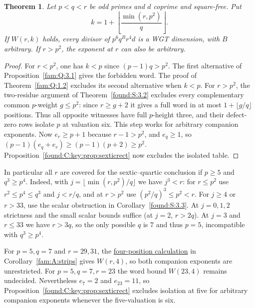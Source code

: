 \documentclass[11pt,a4paper]{article}
\numberwithin{equation}{section}
\newtheorem{theorem}{Theorem}[section]
\theoremstyle{remark}
\begin{document}
\begin{theorem}\label{found:C:2.2}\label{found:C:key:thm:uniformsix}
Let $p<q<r$ be odd primes and $d$ coprime and square-free. Put
\[
 k=1+\left\lfloor\frac{\min(r,p^2)}q\right\rfloor.
\]
If $W(r,k)$ holds, every divisor of $p^6q^B r^4d$ is a WGT
dimension, with $B$ arbitrary. If $r>p^2$, the exponent at $r$
can also be arbitrary.
\end{theorem}
\begin{proof}
For $r<p^2$, one has $k<p$ since $(p-1)q>p^2$.
The first alternative of Proposition~\ref{fam:Q:3.1} gives the forbidden word. The proof of Theorem~\ref{fam:Q:1.2} excludes its second alternative when $k<p$. For $r>p^2$, the two-residue argument of Theorem~\ref{found:S:3.2}
excludes every complementary common $p$-weight $g\le p^2$: since
$r\ge g+2$ it gives a full word in at most $1+\lfloor g/q\rfloor$
positions. Thus all opposite witnesses have full $p$-height three,
and their defect-zero rows isolate $p$ at valuation six. This step
works for arbitrary companion exponents. Now $e_r\ge p+1$ because
$r-1>p^2$, and $e_q\ge1$, so
$(p-1)(e_q+e_r)\ge(p-1)(p+2)\ge p^2$.
Proposition~\ref{found:C:key:prop:sexticrect} now excludes the isolated table.
\end{proof}

In particular all $r$ are covered for the sextic--quartic conclusion if
$p\ge5$ and $q^3\ge p^4$. Indeed, with
$j=\lfloor\min(r,p^2)/q\rfloor$ we have $j^3<r$: for $r\le p^2$
use $r^2\le p^4\le q^3$ and $j<r/q$, and at $r>p^2$ use
$(p^2/q)^3\le p^2<r$. For $j\ge4$ or $r>33$, use the scalar obstruction in Corollary~\ref{found:S:3.3}. At $j=0,1,2$ strictness and the
small scalar bounds suffice (at $j=2$, $r>2q$). At $j=3$ and
$r\le33$ we have $r>3q$, so the only possible $q$ is $7$ and thus
$p=5$, incompatible with $q^3\ge p^4$.

For $p=5,q=7$ and $r=29,31$, the \href{https://github.com/sebastienpalcoux/WGT-fusion-categories/blob/f7f9f9a02f3116e61eb9dca4eebfed77001494e8/code/exposed_support.py}{four-position calculation} in Corollary~\ref{fam:A:strips} gives $W(r,4)$, so both companion exponents are unrestricted.
For $p=5,q=7,r=23$ the word bound $W(23,4)$ remains undecided.
Nevertheless $e_7=2$ and $e_{23}=11$, so
Proposition~\ref{found:C:key:prop:sexticrect} excludes isolation at five for
arbitrary companion exponents whenever the five-valuation is six.
\end{document}
